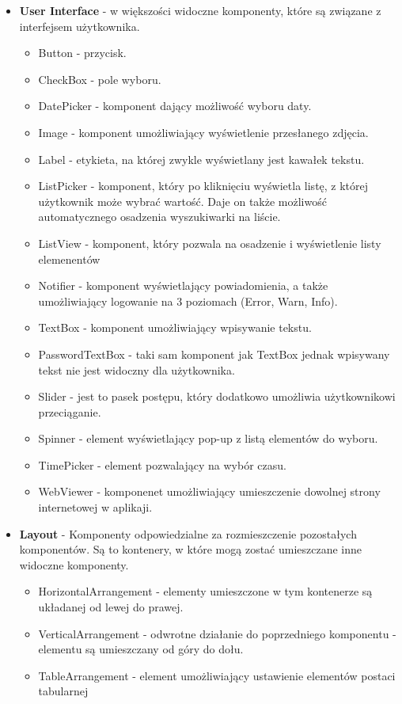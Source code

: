 \begin{itemize}

\item \textbf{User Interface} - w większości widoczne komponenty, które są związane z interfejsem użytkownika.
\begin{itemize}
\item Button - przycisk.
\item CheckBox - pole wyboru.
\item DatePicker - komponent dający możliwość wyboru daty.
\item Image - komponent umożliwiający wyświetlenie przesłanego zdjęcia.
\item Label - etykieta, na której zwykle wyświetlany jest kawałek tekstu.
\item ListPicker - komponent, który po kliknięciu wyświetla listę, z której użytkownik może wybrać wartość. Daje on także możliwość automatycznego osadzenia wyszukiwarki na liście.
\item ListView - komponent, który pozwala na osadzenie i wyświetlenie listy elemenentów
\item Notifier - komponent wyświetlający powiadomienia, a także umożliwiający logowanie na 3 poziomach (Error, Warn, Info).
\item TextBox - komponent umożliwiający wpisywanie tekstu.
\item PasswordTextBox - taki sam komponent jak TextBox jednak wpisywany tekst nie jest widoczny dla użytkownika.
\item Slider - jest to pasek postępu, który dodatkowo umożliwia użytkownikowi przeciąganie.
\item Spinner - element wyświetlający pop-up z listą elementów do wyboru.
\item TimePicker - element pozwalający na wybór czasu.
\item WebViewer - komponenet umożliwiający umieszczenie dowolnej strony internetowej w aplikaji.
\end{itemize}

\item \textbf{Layout} - Komponenty odpowiedzialne za rozmieszczenie pozostałych komponentów. Są to kontenery, w które mogą zostać umieszczane inne widoczne komponenty.
\begin{itemize}
\item HorizontalArrangement - elementy umieszczone w tym kontenerze są układanej od lewej do prawej.
\item VerticalArrangement - odwrotne działanie do poprzedniego komponentu - elementu są umieszczany od góry do dołu.
\item TableArrangement - element umożliwiający ustawienie elementów postaci tabularnej
\end{itemize}



\end{itemize}
